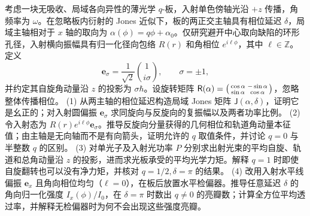 考虑一块无吸收、局域各向异性的薄光学 \(q\)-板，入射单色傍轴光沿 \(+z\) 传播，角频率为 \(\omega\)。在忽略板内衍射的 Jones 近似下，板的两正交主轴具有相位延迟 \(\delta\)，局域主轴相对于 \(x\) 轴的取向为 \(\alpha(\phi)=q\phi+\alpha_0\)。仅研究避开中心取向缺陷的环形孔径，入射横向振幅具有归一化径向包络 \(R(r)\) 和角相位 \(e^{i\ell\phi}\)，其中 \(\ell\in\mathbb Z\)。定义
\[
\mathbf e_\sigma=\frac1{\sqrt2}\binom{1}{i\sigma},\qquad \sigma=\pm1,
\]
并约定其自旋角动量沿 \(z\) 的投影为 \(\sigma\hbar\)。设旋转矩阵 \(\mathsf R(\alpha)=\begin{psmallmatrix}\cos\alpha&-\sin\alpha\\\sin\alpha&\cos\alpha\end{psmallmatrix}\)，忽略整体传播相位。
(1) 从两主轴的相位延迟构造局域 Jones 矩阵 \(\mathsf J(\alpha,\delta)\)，证明它是幺正的；对入射圆偏振 \(\mathbf e_\sigma\) 求同旋向与反旋向的复振幅以及两者功率比例。
(2) 令入射态为 \(R(r)e^{i\ell\phi}\mathbf e_\sigma\)。推导反旋向分量获得的几何相位和轨道角动量本征值；由主轴是无向轴而不是有向箭头，证明允许的 \(q\) 取值条件，并讨论 \(q=0\) 与半整数 \(q\) 的区别。
(3) 对单光子及入射光功率 \(P\) 分别求出射光束的平均自旋、轨道和总角动量沿 \(z\) 的投影，进而求光板承受的平均光学力矩。解释 \(q=1\) 时即使自旋翻转也可以没有净力矩，并核对 \(q=1/2,\delta=\pi\) 的结果。
(4) 改用入射水平线偏振 \(\mathbf e_x\) 且角向相位均匀（\(\ell=0\)），在板后放置水平检偏器。推导任意延迟 \(\delta\) 的角向归一化强度 \(I_x(\phi)/I_0\)，在 \(\delta=\pi\) 时数出 \(q\ne0\) 的亮瓣数；计算全方位平均透过率，并解释无检偏器时为何不会出现这些强度亮瓣。
